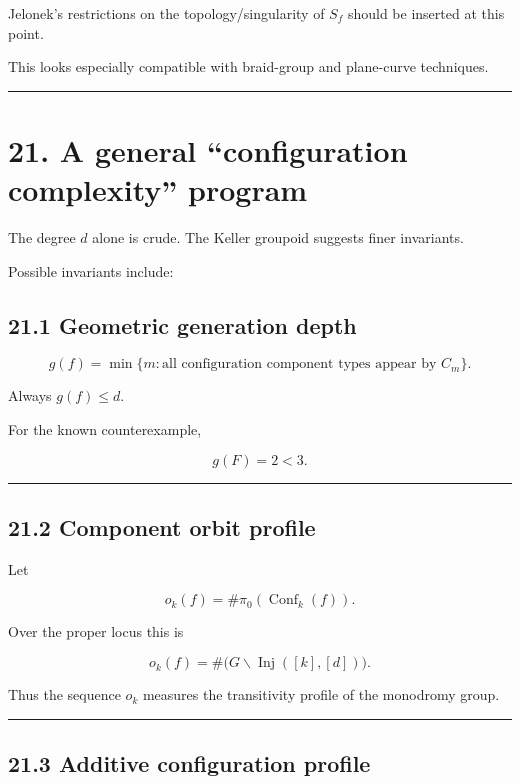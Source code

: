 Jelonek's restrictions on the topology/singularity of \(S_f\) should be
inserted at this point.

This looks especially compatible with braid-group and plane-curve
techniques.

\begin{center}\rule{0.5\linewidth}{0.5pt}\end{center}

\section{21. A general ``configuration complexity''
program}\label{a-general-configuration-complexity-program}

The degree \(d\) alone is crude. The Keller groupoid suggests finer
invariants.

Possible invariants include:

\subsection{21.1 Geometric generation
depth}\label{geometric-generation-depth}

\[
g(f)=
\min\{m:\text{all configuration component types appear by }C_m\}.
\]

Always \(g(f)\le d\).

For the known counterexample,

\[
g(F)=2<3.
\]

\begin{center}\rule{0.5\linewidth}{0.5pt}\end{center}

\subsection{21.2 Component orbit profile}\label{component-orbit-profile}

Let

\[
o_k(f)=\#\pi_0(\operatorname{Conf}_k(f)).
\]

Over the proper locus this is

\[
o_k(f)
=
\#\bigl(G\backslash\operatorname{Inj}([k],[d])\bigr).
\]

Thus the sequence \(o_k\) measures the transitivity profile of the
monodromy group.

\begin{center}\rule{0.5\linewidth}{0.5pt}\end{center}

\subsection{21.3 Additive configuration
profile}\label{additive-configuration-profile}

